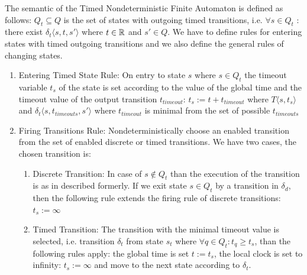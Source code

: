 			The semantic of the Timed Nondeterministic Finite Automaton is defined as follows:
			$Q_t \subseteq Q$ is the set of states with outgoing timed transitions, i.e. $\forall s \in Q_t$ : there exist $ \delta_t\langle s, t, s' \rangle$ where $t \in \mathbb{R}$ and $s' \in Q$.
			We have to define rules for entering states with timed outgoing transitions and we also define the general rules of changing states. 
			\begin{enumerate}
				\item Entering Timed State Rule: On entry to state $s$ where $s \in Q_t$ the timeout variable $t_s$ of the state is set according to the value of the global time and the timeout value of the output transition $t_{timeout}$:
					$t_s:= t+t_{timeout}$ %
					where $T\langle s,t_s \rangle$ and $\delta_t\langle s,t_{timeouts},s' \rangle$ where $t_{timeout}$ is minimal from the set of possible $t_{timeouts}$ 
				
				\item Firing Transitions Rule: Nondeterministically choose an enabled transition from the set of enabled discrete or timed transitions. We have two cases, the chosen transition is:
					\begin{enumerate}
						\item Discrete Transition: In case of $s \notin Q_t$ than the execution of the transition is as in described formerly. If we exit state $s \in Q_t$ by a transition in $\delta_d$, 
						then the following rule extends the firing rule of discrete transitions:
							$t_s := \infty$
						\item Timed Transition: The transition with the minimal timeout value is selected, i.e. transition $\delta_t$ from state $s_t$ where $\forall q \in Q_t: t_q \geq t_s$, than the following rules apply:
						 the global time is set $t := t_s$, the local clock is set to infinity: $t_s := \infty$ and move to the next state according to $\delta_t$.
							
					\end{enumerate}
					
			
			\end{enumerate}
				

